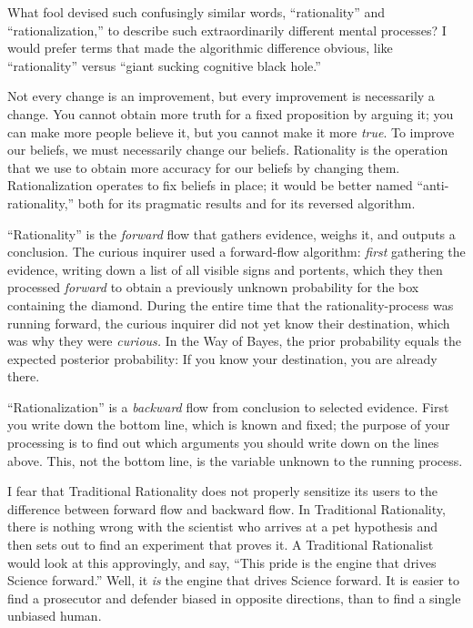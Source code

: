 {
 What fool devised such confusingly similar words,
``rationality'' and
``rationalization,'' to describe
such extraordinarily different mental processes? I would prefer terms
that made the algorithmic difference obvious, like
``rationality'' versus
``giant sucking cognitive black
hole.''}

{
 Not every change is an improvement, but every improvement is
necessarily a change. You cannot obtain more truth for a fixed
proposition by arguing it; you can make more people believe it, but you
cannot make it more \textit{true}. To improve our beliefs, we must
necessarily change our beliefs. Rationality is the operation that we
use to obtain more accuracy for our beliefs by changing them.
Rationalization operates to fix beliefs in place; it would be better
named ``anti-rationality,'' both for
its pragmatic results and for its reversed algorithm.}

{
 ``Rationality'' is the
\textit{forward} flow that gathers evidence, weighs it, and outputs a
conclusion. The curious inquirer used a forward-flow algorithm:
\textit{first} gathering the evidence, writing down a list of all
visible signs and portents, which they then processed \textit{forward}
to obtain a previously unknown probability for the box containing the
diamond. During the entire time that the rationality-process was
running forward, the curious inquirer did not yet know their
destination, which was why they were \textit{curious.} In the Way of
Bayes, the prior probability equals the expected posterior probability:
If you know your destination, you are already there.}

{
 ``Rationalization'' is a
\textit{backward} flow from conclusion to selected evidence. First you
write down the bottom line, which is known and fixed; the purpose of
your processing is to find out which arguments you should write down on
the lines above. This, not the bottom line, is the variable unknown to
the running process.}

{
 I fear that Traditional Rationality does not properly sensitize
its users to the difference between forward flow and backward flow. In
Traditional Rationality, there is nothing wrong with the scientist who
arrives at a pet hypothesis and then sets out to find an experiment
that proves it. A Traditional Rationalist would look at this
approvingly, and say, ``This pride is the engine that
drives Science forward.'' Well, it \textit{is} the
engine that drives Science forward. It is easier to find a prosecutor
and defender biased in opposite directions, than to find a single
unbiased human.}

